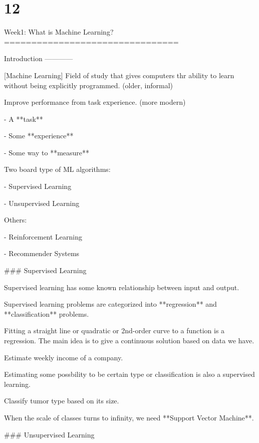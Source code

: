 \documentclass{article}
\begin{document}


\section{12}



\begin{markdown}

Week1: What is Machine Learning?
================================

Introduction
------------

[Machine Learning] Field of study that gives computers thr ability to
learn without being explicitly programmed. (older, informal)

Improve performance from task experience. (more modern)

-   A **task**

-   Some **experience**

-   Some way to **measure**

Two board type of ML algorithms:

-   Supervised Learning

-   Unsupervised Learning

Others:

-   Reinforcement Learning

-   Recommender Systems

### Supervised Learning

Supervised learning has some known relationship between input and
output.

Supervised learning problems are categorized into **regression** and
**classification** problems.

Fitting a straight line or quadratic or 2nd-order curve to a function is
a regression. The main idea is to give a continuous solution based on
data we have.

Estimate weekly income of a company.

Estimating some possbility to be certain type or classification is also
a supervised learning.

Classify tumor type based on its size.

When the scale of classes turns to infinity, we need **Support Vector
Machine**.

### Unsupervised Learning


\end{markdown}
\end{document}
